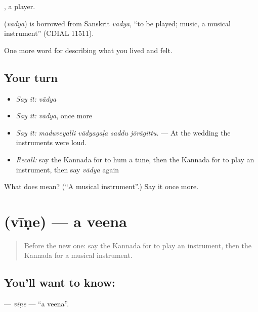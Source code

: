 , a player.

\begin{cousinweb}
\textbf{} (\emph{vādya}) is borrowed from Sanskrit \emph{vādya}, \textquotedblleft{}to be played; music, a musical instrument\textquotedblright{} (CDIAL 11511).
\end{cousinweb}

\begin{grammarlens}[title={What you've built}]
One more word for describing what you lived and felt.
\end{grammarlens}

\subsection*{Your turn}
\begin{itemize}
\raggedright
  \item \emph{Say it:} \emph{vādya}
  \item \emph{Say it:} \emph{vādya}, once more
  \item \emph{Say it:} \emph{maduveyalli vādyagaḷa saddu jōrāgittu.} — At the wedding the instruments were loud.
  \item \emph{Recall:} say the Kannada for to hum a tune, then the Kannada for to play an instrument, then say \emph{vādya} again
\end{itemize}

\begin{tcolorbox}[breakable,colback=teal!4,colframe=teal!35!black,title={Before you move on}]
What does  mean? (\textquotedblleft{}A musical instrument\textquotedblright{}.) Say it once more.
\end{tcolorbox}
\section[\texorpdfstring{\kn{ವೀಣೆ} (vīṇe)}{ವೀಣೆ (vīṇe)}]{ (vīṇe) — a veena}

\label{lesson:KA-C535-vine}



\begin{quote}
Before the new one: say the Kannada for to play an instrument, then the Kannada for a musical instrument.
\end{quote}

\subsection*{You'll want to know: }
\textbf{} — \emph{vīṇe} — \textquotedblleft{}a veena\textquotedblright{}.

